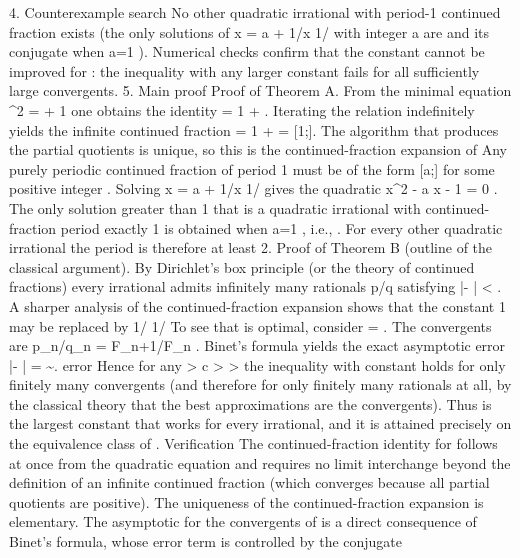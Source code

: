 4. Counterexample search
No other quadratic irrational with period-1 continued fraction exists (the only solutions of
x = a + 1/x
1/
with integer
a
are
\varphi
and its conjugate when
a=1
).
Numerical checks confirm that the constant
cannot be improved for
\varphi
: the inequality with any larger constant fails for all sufficiently large convergents.
5. Main proof
Proof of Theorem A.
From the minimal equation
\varphi^2 = \varphi + 1
one obtains the identity
\varphi = 1 + .
Iterating the relation indefinitely yields the infinite continued fraction
\varphi = 1 +  = [1;].
The algorithm that produces the partial quotients is unique, so this is the continued-fraction expansion of
\varphi
Any purely periodic continued fraction of period 1 must be of the form
[a;]
for some positive integer
. Solving
x = a + 1/x
1/
gives the quadratic
x^2 - a x - 1 = 0
. The only solution greater than 1 that is a quadratic irrational with continued-fraction period exactly 1 is obtained when
a=1
, i.e.,
\varphi
. For every other quadratic irrational the period is therefore at least 2.
Proof of Theorem B (outline of the classical argument).
By Dirichlet’s box principle (or the theory of continued fractions) every irrational
\alpha
admits infinitely many rationals
p/q
satisfying
\bigl|\alpha - \bigr| < .
A sharper analysis of the continued-fraction expansion shows that the constant 1 may be replaced by
1/
1/
To see that
is optimal, consider
\alpha = \varphi
. The convergents are
p_n/q_n = F_{n+1}/F_n
. Binet’s formula yields the exact asymptotic
error
\bigl|\varphi - \bigr| =  \sim {}.
error
Hence for any
>
c > 
>
the inequality with constant
holds for only finitely many convergents (and therefore for only finitely many rationals at all, by the classical theory that the best approximations are the convergents).
Thus
is the largest constant that works for every irrational, and it is attained precisely on the equivalence class of
. Verification
The continued-fraction identity for
\varphi
follows at once from the quadratic equation and requires no limit interchange beyond the definition of an infinite continued fraction (which converges because all partial quotients are positive).
The uniqueness of the continued-fraction expansion is elementary.
The asymptotic for the convergents of
\varphi
is a direct consequence of Binet’s formula, whose error term is controlled by the conjugate
